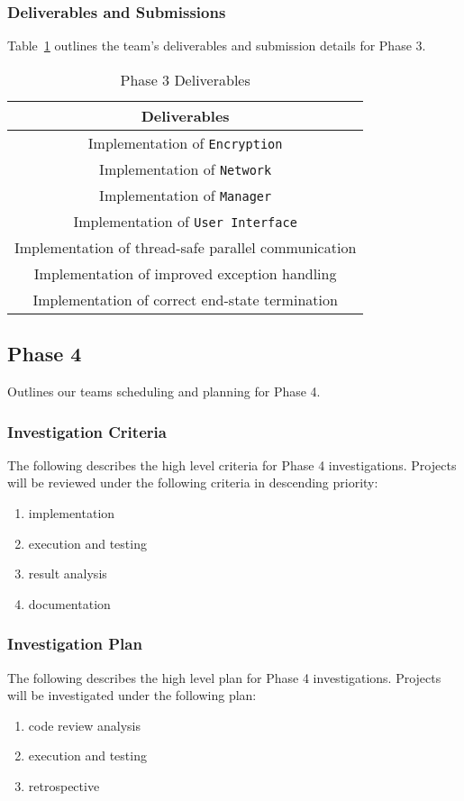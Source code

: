 \documentclass[sigconf]{acmart}
\begin{document}
\subsubsection{Deliverables and Submissions}
Table~\ref{Phase 3 Deliverables} outlines the team's deliverables and
submission details for Phase 3.
\begin{table}[htb]
	\centering
	\caption{Phase 3 Deliverables}
	\label{Phase 3 Deliverables}

	\begin{tabular}{|c|} \hline
		\textbf{Deliverables}                                \\ \hline
		Implementation of \texttt{Encryption}                \\ \hline
		Implementation of \texttt{Network}                   \\ \hline
		Implementation of \texttt{Manager}                   \\ \hline
		Implementation of \texttt{User Interface}            \\ \hline
		Implementation of thread-safe parallel communication \\ \hline
		Implementation of improved exception handling        \\ \hline
		Implementation of correct end-state termination      \\ \hline
	\end{tabular}
\end{table}


\subsection{Phase 4}
Outlines our teams scheduling and planning for Phase 4.

\subsubsection{Investigation Criteria}
The following describes the high level criteria for Phase 4 investigations.
Projects will be reviewed under the following criteria in descending priority:
\begin{enumerate}
	\item implementation
	\item execution and testing
	\item result analysis
	\item documentation
\end{enumerate}

\subsubsection{Investigation Plan}
The following describes the high level plan for Phase 4 investigations. Projects
will be investigated under the following plan:
\begin{enumerate}
	\item code review analysis
	\item execution and testing
	\item retrospective
\end{enumerate}
\end{document}
